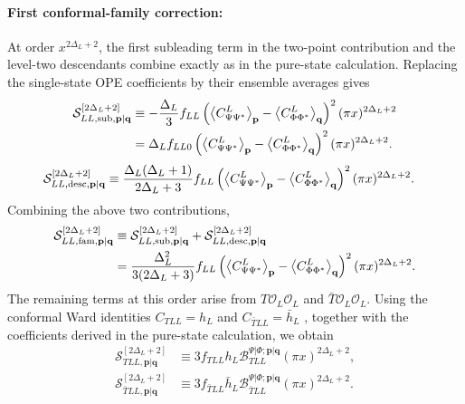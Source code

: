 \documentclass[11pt]{article}
\newcommand{\nn}{\nonumber}
\begin{document}
\paragraph{First conformal-family correction:}
At order $x^{2\Delta_L+2}$, the first subleading term in the two-point
contribution and the level-two descendants combine exactly as in the
pure-state calculation. Replacing the single-state OPE coefficients by
their ensemble averages gives
\begin{align}
    \mathcal S_{LL,{\rm sub},\mathbf p|\mathbf q}^{[2\Delta_L+2]}
    &\equiv
    -\frac{\Delta_L}{3}
    f_{LL}
    \left(
    \left\langle C_{\Psi\Psi^*}^{L}\right\rangle_{\mathbf p}
    -
    \left\langle C_{\Phi\Phi^*}^{L}\right\rangle_{\mathbf q}
    \right)^2
    (\pi x)^{2\Delta_L+2}
    \nn\\
    &=
    \Delta_L f_{LL0}
    \left(
    \left\langle C_{\Psi\Psi^*}^{L}\right\rangle_{\mathbf p}
    -
    \left\langle C_{\Phi\Phi^*}^{L}\right\rangle_{\mathbf q}
    \right)^2
    (\pi x)^{2\Delta_L+2}.
\end{align}
\begin{align}
    \mathcal S_{LL,{\rm desc},\mathbf p|\mathbf q}^{[2\Delta_L+2]}
    &\equiv
    \frac{\Delta_L(\Delta_L+1)}
    {2\Delta_L+3}
    f_{LL}
    \left(
    \left\langle C_{\Psi\Psi^*}^{L}\right\rangle_{\mathbf p}
    -
    \left\langle C_{\Phi\Phi^*}^{L}\right\rangle_{\mathbf q}
    \right)^2
    (\pi x)^{2\Delta_L+2}.
\end{align}
Combining the above two contributions,
\begin{align}
    \mathcal S_{LL,{\rm fam},\mathbf p|\mathbf q}^{[2\Delta_L+2]}
    &\equiv
    \mathcal S_{LL,{\rm sub},\mathbf p|\mathbf q}^{[2\Delta_L+2]}
    +
    \mathcal S_{LL,{\rm desc},\mathbf p|\mathbf q}^{[2\Delta_L+2]}
    \nn\\
    &=
    \frac{\Delta_L^2}
    {3(2\Delta_L+3)}
    f_{LL}
    \left(
    \left\langle C_{\Psi\Psi^*}^{L}\right\rangle_{\mathbf p}
    -
    \left\langle C_{\Phi\Phi^*}^{L}\right\rangle_{\mathbf q}
    \right)^2
    (\pi x)^{2\Delta_L+2}.
\end{align}
The remaining terms at this order arise from
$T\mathcal O_L\mathcal O_L$ and
$\bar T\mathcal O_L\mathcal O_L$. Using the conformal Ward identities
$C_{TLL}=h_L$ and $C_{\bar TLL}=\bar h_L$ \cite{yellowbook}, together with the coefficients
derived in the pure-state calculation, we obtain
\begin{align}
    \mathcal S_{TLL,\mathbf p|\mathbf q}^{[2\Delta_L+2]}
    &\equiv
    3
    f_{TLL}h_L
    \mathcal B_{TLL}^{\Psi|\Phi;\mathbf p|\mathbf q}
    (\pi x)^{2\Delta_L+2},
    \\
    \mathcal S_{\bar TLL,\mathbf p|\mathbf q}^{[2\Delta_L+2]}
    &\equiv
    3
    f_{\bar TLL}\bar h_L
    \mathcal B_{\bar TLL}^{\Psi|\Phi;\mathbf p|\mathbf q}
    (\pi x)^{2\Delta_L+2}.
\end{align}
\end{document}
